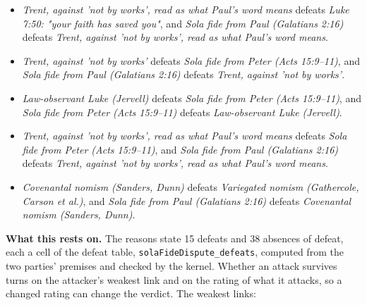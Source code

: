 \documentclass[11pt]{article}
\begin{document}
\begin{itemize}
\begin{itemize}
\item \emph{Trent, against 'not by works', read as what Paul's word means} defeats \emph{Luke 7:50: "your faith has saved you"}, and \emph{Sola fide from Paul (Galatians 2:16)} defeats \emph{Trent, against 'not by works', read as what Paul's word means}.
\item \emph{Trent, against 'not by works'} defeats \emph{Sola fide from Peter (Acts 15:9–11)}, and \emph{Sola fide from Paul (Galatians 2:16)} defeats \emph{Trent, against 'not by works'}.
\item \emph{Law-observant Luke (Jervell)} defeats \emph{Sola fide from Peter (Acts 15:9–11)}, and \emph{Sola fide from Peter (Acts 15:9–11)} defeats \emph{Law-observant Luke (Jervell)}.
\item \emph{Trent, against 'not by works', read as what Paul's word means} defeats \emph{Sola fide from Peter (Acts 15:9–11)}, and \emph{Sola fide from Paul (Galatians 2:16)} defeats \emph{Trent, against 'not by works', read as what Paul's word means}.
\item \emph{Covenantal nomism (Sanders, Dunn)} defeats \emph{Variegated nomism (Gathercole, Carson et al.)}, and \emph{Sola fide from Paul (Galatians 2:16)} defeats \emph{Covenantal nomism (Sanders, Dunn)}.
\end{itemize}
\end{itemize}
\par\noindent\textbf{What this rests on.} The reasons state 15 defeats and 38 absences of defeat, each a cell of the defeat table, \texttt{sola\allowbreak{}Fide\allowbreak{}Dispute\_\allowbreak{}defeats}, computed from the two parties' premises and checked by the kernel. Whether an attack survives turns on the attacker's weakest link and on the rating of what it attacks, so a changed rating can change the verdict. The weakest links:
\end{document}
